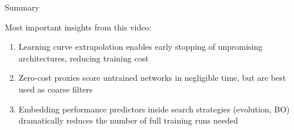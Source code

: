 \documentclass[main]{subfiles}
\begin{document}

\begin{frame}{Summary}

Most important insights from this video:

\begin{enumerate}
    \item Learning curve extrapolation enables early stopping of unpromising architectures, reducing training cost
    \item Zero-cost proxies score untrained networks in negligible time, but are best used as coarse filters
    \item Embedding performance predictors inside search strategies (evolution, BO) dramatically reduces the number of full training runs needed
\end{enumerate}


\end{frame}
\end{document}
